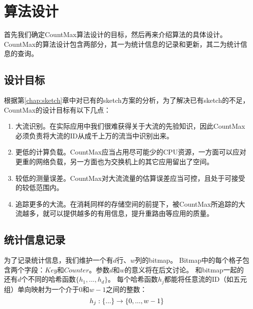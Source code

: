 

\section{算法设计}
首先我们确定CountMax算法设计的目标，然后再来介绍算法的具体设计。
CountMax的算法设计包含两部分，其一为统计信息的记录和更新，其二为统计信息的查询。

\subsection{设计目标}
根据第\ref{chap:sketch}章中对已有的sketch方案的分析，为了解决已有sketch的不足，CountMax的设计目标有以下几点：
\begin{enumerate}
	\item 大流识别。在实际应用中我们很难获得关于大流的先验知识，因此CountMax必须负责将大流的ID从成千上万的流当中识别出来。
	\item 更低的计算负载。CountMax应当占用尽可能少的CPU资源，一方面可以应对更重的网络负载，另一方面也为交换机上的其它应用留出了空间。
	\item 较低的测量误差。CountMax对大流流量的估算误差应当可控，且处于可接受的较低范围内。
	\item 追踪更多的大流。在消耗同样的存储空间的前提下，被CountMax所追踪的大流越多，就可以提供越多的有用信息，提升重路由等应用的质量。
\end{enumerate}
\subsection{统计信息记录}

为了记录统计信息，我们维护一个有$d$行、$w$列的bitmap。
Bitmap中的每个格子包含两个字段：$Key$和$Counter$。参数$d$和$w$的意义将在后文讨论。
和bitmap一起的还有$d$个不同的哈希函数$\{h_{1},...,h_{d}\}$。
每个哈希函数$h_j$都能将任意流的ID（如五元组）单向映射为一个介于$0$和$w-1$之间的整数：
\begin{equation}
\notag h_j: \{...\} \to \{0, ..., w-1\}
\end{equation}

